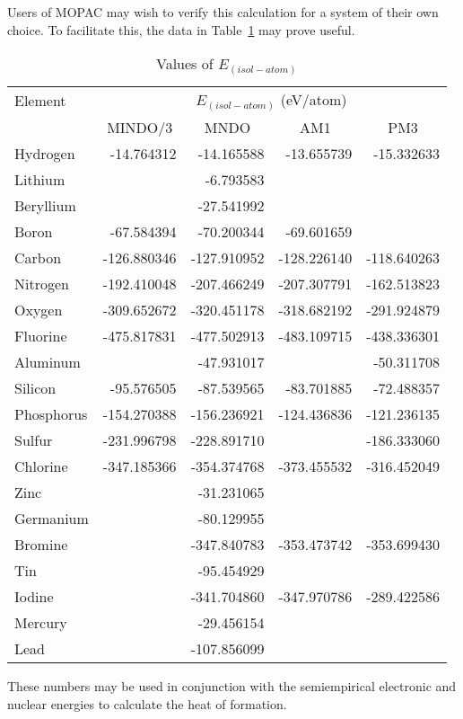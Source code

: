 Users of MOPAC may wish to verify this calculation for a system of their own
choice. To facilitate this, the data in Table~\ref{eisol} may prove useful.

\begin{table}
\caption{\label{eisol}Values of $E_{(isol-atom)}$ }
\begin{center}
\begin{tabular}{lrrrr} \hline
Element  & \multicolumn{4}{c}{$E_{(isol-atom)}$ (eV/atom)} \\ \cline{2-5}
& \multicolumn{1}{c}{MINDO/3} & \multicolumn{1}{c}{MNDO} &
\multicolumn{1}{c}{AM1} & \multicolumn{1}{c}{PM3} \\
\hline
Hydrogen            &-14.764312&   -14.165588& -13.655739& -15.332633  \\
Lithium             && -6.793583  \\
Beryllium           &&-27.541992  \\
Boron               &-67.584394   &-70.200344 &-69.601659  \\
Carbon            & -126.880346  &-127.910952&-128.226140&-118.640263  \\
Nitrogen           &-192.410048 & -207.466249&-207.307791&-162.513823  \\
Oxygen &-309.652672&-320.451178 &-318.682192&-291.924879  \\
Fluorine& -475.817831&-477.502913&-483.109715&-438.336301  \\
Aluminum& &  -47.931017 & &-50.311708  \\
Silicon &-95.576505&-87.539565&-83.701885&-72.488357  \\
Phosphorus &-154.270388&-156.236921&-124.436836&-121.236135  \\
Sulfur& -231.996798&-228.891710  &&-186.333060  \\
Chlorine& -347.185366&-354.374768&-373.455532&-316.452049  \\
Zinc  &  &-31.231065  \\
Germanium& &  -80.129955  \\
Bromine&  & -347.840783&-353.473742&-353.699430  \\
Tin  & &-95.454929  \\
Iodine&  &-341.704860&-347.970786&-289.422586  \\
Mercury & &-29.456154  \\
Lead & &-107.856099  \\ \hline
\end{tabular}
\end{center}
\end{table}

These numbers may be used in conjunction with the semiempirical electronic and
nuclear energies to calculate the heat of formation.
